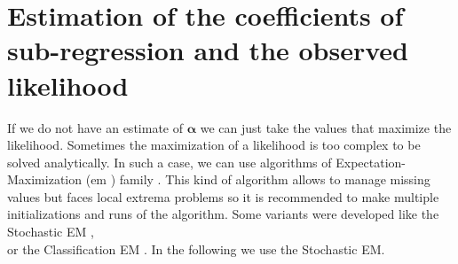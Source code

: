 \documentclass[12pt,a4paper]{report}
\begin{document}
	\section{Estimation of the coefficients of sub-regression and the observed likelihood}
			If we do not have an estimate of $\boldsymbol{\alpha}$ we can just take the values that maximize the likelihood. Sometimes the maximization of a likelihood is too complex to be solved analytically. In such a case, we can use algorithms of Expectation-Maximization ({\sc em} \cite{mclachlan2007algorithm}) family \cite{mclachlan2007algorithm}. This kind of algorithm allows to manage missing values \cite{dempster1977maximum}  %
%			
	but faces local extrema problems so it is recommended to make multiple initializations and runs of the algorithm. Some variants were developed like the Stochastic EM \cite{diebolt1996stochastic},\\
			 \cite{celeux1986algorithme} or the Classification EM \cite{celeux1992classification}. In the following we use the Stochastic EM.
						
\end{document}
